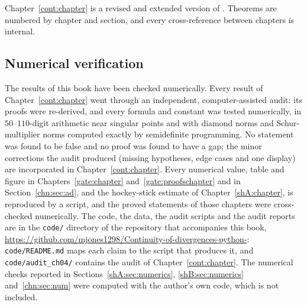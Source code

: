 Chapter~\ref{cont:chapter} is a revised and extended version of \cite{Jones2026}. Theorems are numbered by chapter and section, and every cross-reference between chapters is internal.

\subsection*{Numerical verification}
The results of this book have been checked numerically. Every result of Chapter~\ref{cont:chapter} went through an independent, computer-assisted audit: its proofs were re-derived, and every formula and constant was tested numerically, in $50$--$110$-digit arithmetic near singular points and with diamond norms and Schur-multiplier norms computed exactly by semidefinite programming. No statement was found to be false and no proof was found to have a gap; the minor corrections the audit produced (missing hypotheses, edge cases and one display) are incorporated in Chapter~\ref{cont:chapter}. Every numerical value, table and figure in Chapters~\ref{gate:chapter} and~\ref{gate:proofschapter} and in Section~\ref{chn:sec:ad}, and the hockey-stick estimate of Chapter~\ref{shA:chapter}, is reproduced by a script, and the proved statements of those chapters were cross-checked numerically. The code, the data, the audit scripts and the audit reports are in the \texttt{code/} directory of the repository that accompanies this book, \url{https://github.com/mjones1298/Continuity-of-divergences-python-}: \texttt{code/README.md} maps each claim to the script that produces it, and \texttt{code/audit\_ch04/} contains the audit of Chapter~\ref{cont:chapter}. The numerical checks reported in Sections~\ref{shA:sec:numerics}, \ref{shB:sec:numerics} and~\ref{chn:sec:num} were computed with the author's own code, which is not included.

\endgroup

